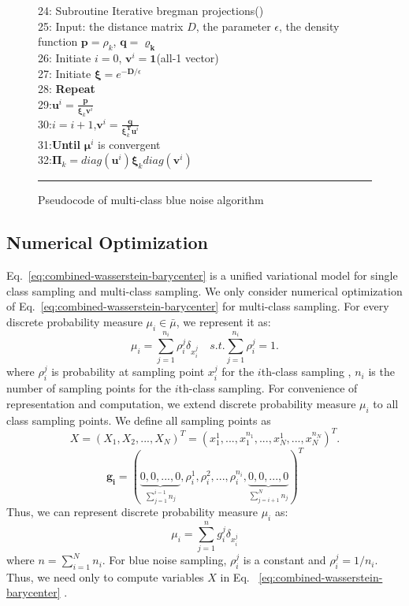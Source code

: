 \begin{figure}[htb]
24: Subroutine Iterative bregman projections()\\
25: Input: the distance matrix $D$, the parameter $\epsilon$,
    the density function $\mathbf{p}=\rho_k$,
    $\mathbf{q}=\mathbf{\varrho_{k}}$\\
26: Initiate $i=0$, $\mathbf{v}^i=\mathbf{1}$(all-1 vector)\\
27: Initiate $\mathbf\xi=e^{-\mathbf{D}/\epsilon}$\\
28: \textbf{Repeat}\\
29:\quad $\mathbf{u}^i=\frac{\mathbf{p}}{\mathbf{\xi}_k\mathbf{v}^i}$\\
30:\quad $i=i+1$,$\mathbf{v}^i=\frac{\mathbf{q}}{\mathbf{\xi}_k^\mathbf{T}\mathbf{u}^i}$\\
31:\textbf{Until} $\mathbf{\mu}^i$ is convergent\\
32:$\mathbf{\Pi}_k=diag(\mathbf{u}^i)\mathbf{\xi}_k diag({\mathbf{v}^i})$\\
   \rule{0.47\textwidth}{0.5pt}
  \caption{Pseudocode of multi-class blue noise algorithm}\label{fig:pseudocode}
\end{figure}


\subsection{Numerical Optimization}
Eq.~\ref{eq:combined-wasserstein-barycenter} is a unified variational model for single class sampling and multi-class sampling.
We only consider numerical optimization of Eq.~\ref{eq:combined-wasserstein-barycenter}
for multi-class sampling.
For every discrete probability measure $\mu_i\in\bar\mu$,
we represent it as:
\begin{equation}
 \mu_i=\sum\limits_{j=1}^{n_i}\rho_i^j\delta_{x_i^j} \quad s.t. \sum\limits_{j=1}^{n_i}\rho_i^j=1.
\end{equation}
where $\rho_i^j$ is probability at sampling point $x_i^j$ for the $i$th-class sampling
, $n_i$ is the number of sampling points for the $i$th-class sampling.
For convenience of representation and computation,
we extend discrete probability measure $\mu_i$ to all class sampling points.
We define all sampling points as
\begin{equation}
 X=(X_1,X_2,...,X_N)^T=(x_1^1,...,x_1^{n_1},...,x_N^1,...,x_N^{n_N})^T.
\end{equation}
\begin{equation}
\mathbf{g_i}=(\underbrace{0,0,...,0}_{\sum\limits_{j=1}^{i-1}n_j},\rho_i^1,\rho_i^2,...,\rho_i^{n_i},\underbrace{0,0,...,0}_{\sum\limits_{j=i+1}^{N}n_j})^T
\end{equation}
Thus,
we can represent discrete probability measure $\mu_i$ as:
\begin{equation}
  \mu_i=\sum\limits_{j=1}^{n}g_i^j\delta_{x_i^j}
\end{equation}
where $n=\sum\limits_{i=1}^N{n_i}$.
For blue noise sampling,
$\rho_i^j$ is a constant and $\rho_i^j=1/n_i$.
Thus, we need only to compute variables $X$ in Eq. ~\ref{eq:combined-wasserstein-barycenter} .

